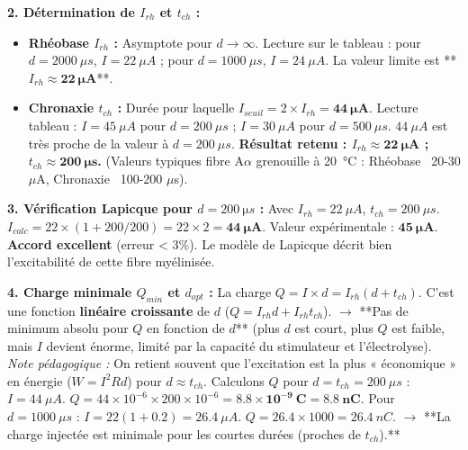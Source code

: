 \documentclass[11pt]{article}
\begin{document}
\begin{exoresolu}
\textbf{2. Détermination de $I_{rh}$ et $t_{ch}$ :}
\begin{itemize}
    \item \textbf{Rhéobase $I_{rh}$ :} Asymptote pour $d \to \infty$. Lecture sur le tableau : pour $d=2000\ \mu s$, $I=22\ \mu A$ ; pour $d=1000\ \mu s$, $I=24\ \mu A$. La valeur limite est **$I_{rh} \approx \mathbf{22\ \mu A}$**.
    \item \textbf{Chronaxie $t_{ch}$ :} Durée pour laquelle $I_{seuil} = 2 \times I_{rh} = \mathbf{44\ \mu A}$.
    Lecture tableau : $I=45\ \mu A$ pour $d=200\ \mu s$ ; $I=30\ \mu A$ pour $d=500\ \mu s$.
    $44\ \mu A$ est très proche de la valeur à $d=200\ \mu s$.
    \textbf{Résultat retenu : $I_{rh} \approx \mathbf{22\ \mu A}$ ; $t_{ch} \approx \mathbf{200\ \mu s}$.} (Valeurs typiques fibre A$\alpha$ grenouille à \SI{20}{\celsius} : Rhéobase ~20-30 $\mu$A, Chronaxie ~100-200 $\mu$s).
\end{itemize}

\textbf{3. Vérification Lapicque pour $d = \SI{200}{\micro s}$ :}
Avec $I_{rh}=22\ \mu A$, $t_{ch}=200\ \mu s$.
$I_{calc} = 22 \times (1 + 200/200) = 22 \times 2 = \mathbf{44\ \mu A}$.
Valeur expérimentale : $\mathbf{45\ \mu A}$.
\textbf{Accord excellent} (erreur < 3\%). Le modèle de Lapicque décrit bien l'excitabilité de cette fibre myélinisée.

\textbf{4. Charge minimale $Q_{min}$ et $d_{opt}$ :}
La charge $Q = I \times d = I_{rh} (d + t_{ch})$.
C'est une fonction \textbf{linéaire croissante} de $d$ ($Q = I_{rh}d + I_{rh}t_{ch}$).
$\rightarrow$ **Pas de minimum absolu pour $Q$ en fonction de $d$** (plus $d$ est court, plus $Q$ est faible, mais $I$ devient énorme, limité par la capacité du stimulateur et l'électrolyse).
\textit{Note pédagogique :} On retient souvent que l'excitation est la plus « économique » en énergie ($W = I^2 R d$) pour $d \approx t_{ch}$.
Calculons $Q$ pour $d = t_{ch} = 200\ \mu s$ : $I = 44\ \mu A$. $Q = 44 \times 10^{-6} \times 200 \times 10^{-6} = \mathbf{8.8 \times 10^{-9}\ C = 8.8\ nC}$.
Pour $d = 1000\ \mu s$ : $I = 22(1+0.2) = 26.4\ \mu A$. $Q = 26.4 \times 1000 = 26.4\ nC$.
$\rightarrow$ **La charge injectée est minimale pour les courtes durées (proches de $t_{ch}$).**


\end{exoresolu}
\end{document}
